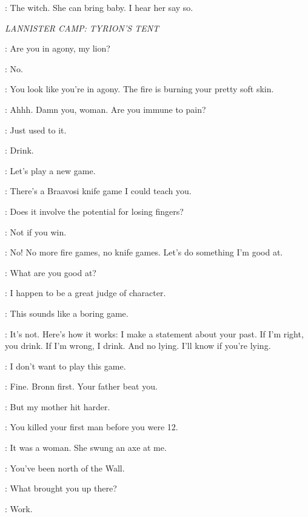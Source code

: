 \RAKHARO: The witch. She can bring baby. I hear her say so. 


\scene

\textit{LANNISTER CAMP: TYRION'S TENT} 


\SHAE: Are you in agony, my lion? 

\TYRION: No. 

\SHAE: You look like you're in agony. The fire is burning your pretty soft skin. 

\TYRION:  Ahhh. Damn you, woman. Are you immune to pain? 

\SHAE: Just used to it. 

\BRONN: Drink. 

\TYRION: Let's play a new game. 

\BRONN: There's a Braavosi knife game I could teach you.

\TYRION: Does it involve the potential for losing fingers? 

\BRONN: Not if you win. 

\TYRION: No! No more fire games, no knife games. Let's do something I'm good at. 

\SHAE: What are you good at? 

\TYRION: I happen to be a great judge of character. 

\BRONN: This sounds like a boring game. 

\TYRION: It's not. Here's how it works: I make a statement about your past. If I'm right, you drink. If I'm wrong, I drink. And no lying. I'll know if you're lying. 

\SHAE: I don't want to play this game. 

\TYRION: Fine. Bronn first. Your father beat you. 

\BRONN:  But my mother hit harder. 

\TYRION: You killed your first man before you were 12. 

\BRONN: It was a woman. She swung an axe at me. 


\TYRION: You've been north of the Wall. 


\SHAE: What brought you up there? 

\BRONN: Work. 

